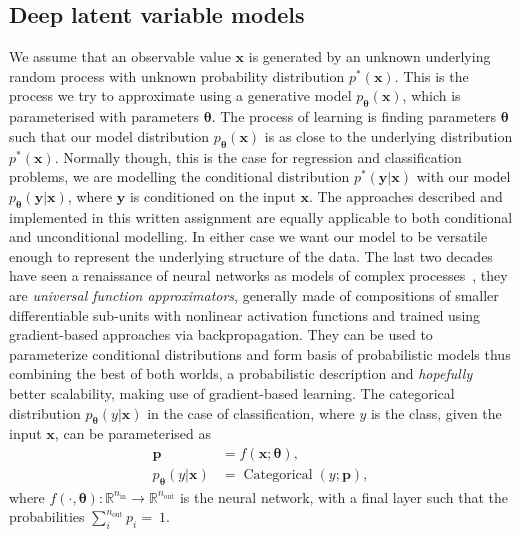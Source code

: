 \documentclass[final,3p,times,twocolumn]{elsarticle}
\begin{document}
\subsection{Deep latent variable models}
\label{sec:DLVM}
We assume that an observable value $\mathbf{x}$ is generated by an unknown underlying random process with unknown probability distribution $p^*(\mathbf{x})$. This is the process we try to approximate using a generative model $p_{\boldsymbol{\theta}}(\mathbf{x})$, which is parameterised with parameters $\boldsymbol{\theta}$. The process of learning is finding parameters $\boldsymbol{\theta}$ such that our model distribution $p_{\boldsymbol{\theta}}(\mathbf{x})$ is as close to the underlying distribution $p^*(\mathbf{x})$. Normally though, this is the case for regression and classification problems, we are modelling the conditional distribution $p^{*}(\mathbf{y} | \mathbf{x})$ with our model $p_{\boldsymbol{\theta}}(\mathbf{y} | \mathbf{x})$, where $\mathbf{y}$ is conditioned on the input $\mathbf{x}$. The approaches described and implemented in this written assignment are equally applicable to both conditional and unconditional modelling. In either case we want our model to be versatile enough to represent the underlying structure of the data. The last two decades have seen a renaissance of neural networks as models of complex processes~\cite{goodfellow2016deep}, they are \emph{universal function approximators}, generally made of compositions of smaller differentiable sub-units with nonlinear activation functions and trained using gradient-based approaches via backpropagation. They can be used to parameterize conditional distributions and form basis of probabilistic models thus combining the best of both worlds, a probabilistic description and \emph{hopefully} better scalability, making use of gradient-based learning. The categorical distribution $p_{\boldsymbol{\theta}}(y|\mathbf{x})$ in the case of classification, where $y$ is the class, given the input $\mathbf{x}$, can be parameterised as
\begin{equation}
	\begin{aligned}
			\mathbf{p} &= f(\mathbf{x}; \boldsymbol{\theta}), \\
			p_{\boldsymbol{\theta}}(y | \mathbf{x})&=\operatorname{Categorical}(y ; \mathbf{p}),
	\end{aligned}
\end{equation}
where $f(\cdot, \boldsymbol{\theta}): \mathbb{R}^{n_{\mathrm{in}}} \rightarrow \mathbb{R}^{n_{\mathrm{out}}}$ is the neural network, with a final layer such that the probabilities $\sum_{i}^{n_\mathrm{out}} p_{i}=~1$. 
\end{document}
